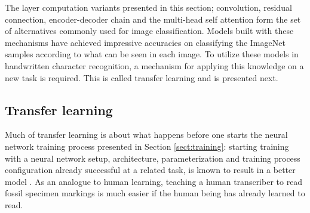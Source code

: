 \documentclass{article}
\begin{document}
The layer computation variants presented in this section; convolution, residual connection, encoder-decoder chain and 
the multi-head self attention form the set of alternatives commonly used for image classification. Models built with these mechanisms 
have achieved impressive accuracies on classifying the ImageNet samples according to what can be seen in each image.
To utilize these models in handwritten character recognition, a mechanism for applying this knowledge on a new task is required.
This is called transfer learning and is presented next.

\subsection{Transfer learning}
\label{sect:transfer_learning}

Much of transfer learning is about what happens before one starts the neural network training process 
presented in Section \ref{sect:training}: starting training with a neural network setup, 
architecture, parameterization and training process configuration already successful at a related task,
is known to result in a better model \cite{transferlearning_survey}. As an analogue to human learning, teaching a human transcriber
to read fossil specimen markings is much easier if the human being has already learned to read.
\end{document}
